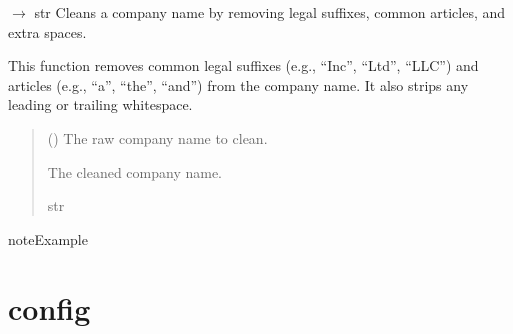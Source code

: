 \documentclass[letterpaper,10pt,english]{sphinxmanual}
\begin{document}
\begin{fulllineitems}
\label{\detokenize{src.utils:src.utils.search.clean_company_name}}
\pysigstartsignatures
\pysiglinewithargsret
{}
{}
{{ $\rightarrow$ str}}
\pysigstopsignatures
\sphinxAtStartPar
Cleans a company name by removing legal suffixes, common articles, and extra spaces.

\sphinxAtStartPar
This function removes common legal suffixes (e.g., “Inc”, “Ltd”, “LLC”) and articles
(e.g., “a”, “the”, “and”) from the company name. It also strips any leading or trailing
whitespace.
\begin{quote}\begin{description}
\sphinxAtStartPar
{} () \textendash{} The raw company name to clean.

\sphinxAtStartPar
The cleaned company name.

\sphinxAtStartPar
str

\end{description}\end{quote}

\begin{sphinxadmonition}{note}{Example}

\begin{sphinxVerbatim}[commandchars=\\\{\}]
  
  
\end{sphinxVerbatim}
\end{sphinxadmonition}

\end{fulllineitems}


\sphinxstepscope


\section{config}
\label{\detokenize{config:config}}\label{\detokenize{config::doc}}\subsubsection*{}
\end{document}
